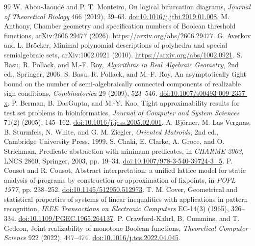 \documentclass[11pt]{article}
\theoremstyle{definition}
\theoremstyle{remark}
\begin{document}
\begin{thebibliography}{99}
 W. Abou-Jaoud\'e and P. T. Monteiro, On logical bifurcation diagrams, \emph{Journal of Theoretical Biology} 466 (2019), 39--63. \href{https://doi.org/10.1016/j.jtbi.2019.01.008}{doi:10.1016/j.jtbi.2019.01.008}.
 M. Anthony, Chamber geometry and specification numbers of Boolean threshold functions, arXiv:2606.29477 (2026). \url{https://arxiv.org/abs/2606.29477}.
 G. Averkov and L. Br\"ocker, Minimal polynomial descriptions of polyhedra and special semialgebraic sets, arXiv:1002.0921 (2010). \url{https://arxiv.org/abs/1002.0921}.
 S. Basu, R. Pollack, and M.-F. Roy, \emph{Algorithms in Real Algebraic Geometry}, 2nd ed., Springer, 2006.
 S. Basu, R. Pollack, and M.-F. Roy, An asymptotically tight bound on the number of semi-algebraically connected components of realizable sign conditions, \emph{Combinatorica} 29 (2009), 523--546. \href{https://doi.org/10.1007/s00493-009-2357-x}{doi:10.1007/s00493-009-2357-x}.
 P. Berman, B. DasGupta, and M.-Y. Kao, Tight approximability results for test set problems in bioinformatics, \emph{Journal of Computer and System Sciences} 71(2) (2005), 145--162. \href{https://doi.org/10.1016/j.jcss.2005.02.001}{doi:10.1016/j.jcss.2005.02.001}.
 A. Bj\"orner, M. Las Vergnas, B. Sturmfels, N. White, and G. M. Ziegler, \emph{Oriented Matroids}, 2nd ed., Cambridge University Press, 1999.
 S. Chaki, E. Clarke, A. Groce, and O. Strichman, Predicate abstraction with minimum predicates, in \emph{CHARME 2003}, LNCS 2860, Springer, 2003, pp. 19--34. \href{https://doi.org/10.1007/978-3-540-39724-3_5}{doi:10.1007/978-3-540-39724-3\_5}.
 P. Cousot and R. Cousot, Abstract interpretation: a unified lattice model for static analysis of programs by construction or approximation of fixpoints, in \emph{POPL 1977}, pp. 238--252. \href{https://doi.org/10.1145/512950.512973}{doi:10.1145/512950.512973}.
 T. M. Cover, Geometrical and statistical properties of systems of linear inequalities with applications in pattern recognition, \emph{IEEE Transactions on Electronic Computers} EC-14(3) (1965), 326--334. \href{https://doi.org/10.1109/PGEC.1965.264137}{doi:10.1109/PGEC.1965.264137}.
 P. Crawford-Kahrl, B. Cummins, and T. Gedeon, Joint realizability of monotone Boolean functions, \emph{Theoretical Computer Science} 922 (2022), 447--474. \href{https://doi.org/10.1016/j.tcs.2022.04.045}{doi:10.1016/j.tcs.2022.04.045}.

\end{thebibliography}
\end{document}
